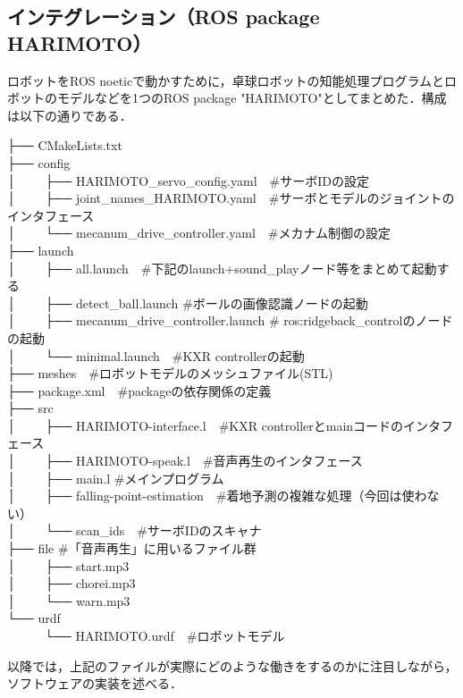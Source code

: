 \documentclass[10pt, oneside, titlepage]{ltjarticle}  %
\begin{document}
\subsection{インテグレーション（ROS package HARIMOTO）}
ロボットをROS noeticで動かすために，卓球ロボットの知能処理プログラムとロボットのモデルなどを1つのROS package "HARIMOTO"としてまとめた．構成は以下の通りである．
\begin{screen}
├── CMakeLists.txt \\
├── config \\
│　　 ├── HARIMOTO\_servo\_config.yaml　\#サーボIDの設定 \\
│　　 ├── joint\_names\_HARIMOTO.yaml　\#サーボとモデルのジョイントのインタフェース \\
│　　 └── mecanum\_drive\_controller.yaml　\#メカナム制御の設定 \\
├── launch \\
│　　 ├── all.launch　\#下記のlaunch+sound\_playノード等をまとめて起動する \\
│　　 ├── detect\_ball.launch \#ボールの画像認識ノードの起動 \\
│　　 ├── mecanum\_drive\_controller.launch \# ros:ridgeback\_controlのノードの起動 \\
│　　 └── minimal.launch　\#KXR controllerの起動 \\
├── meshes　\#ロボットモデルのメッシュファイル(STL) \\
├── package.xml　\#packageの依存関係の定義 \\
├── src \\
│　　 ├── HARIMOTO-interface.l　\#KXR controllerとmainコードのインタフェース \\
│　　 ├── HARIMOTO-speak.l　\#音声再生のインタフェース  \\
│　　 ├── main.l \#メインプログラム  \\
│　　 ├── falling-point-estimation　\#着地予測の複雑な処理（今回は使わない）  \\
│　　 └── scan\_ids　\#サーボIDのスキャナ \\ 
├── file \#「音声再生」に用いるファイル群 \\
│　　 ├── start.mp3 \\
│　　 ├── chorei.mp3 \\
│　　 └── warn.mp3 \\
└── urdf \\
　　　└── HARIMOTO.urdf　\#ロボットモデル
\end{screen}
以降では，上記のファイルが実際にどのような働きをするのかに注目しながら，ソフトウェアの実装を述べる．
\end{document}

